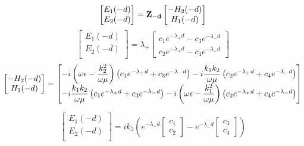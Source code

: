 \begin{equation}
    \begin{bmatrix}
        E_1(-d)\\
        E_2(-d)\\
    \end{bmatrix}
    =
    \mathbf{Z_{-d}} 
    \begin{bmatrix}
        -H_2(-d)\\
        H_1(-d)\\
    \end{bmatrix}
\end{equation}
\begin{equation}
    \begin{bmatrix}
        E_1(-d)\\
        E_2(-d)\\
    \end{bmatrix}
    = \lambda_{+}
    \begin{bmatrix}
        c_1 e^{-\lambda_+ d} - c_3 e^{-\lambda_- d} \\
        c_2 e^{-\lambda_+ d} - c_4 e^{-\lambda_- d}
    \end{bmatrix}
\end{equation}
\begin{equation}
    \begin{bmatrix}
        -H_2(-d)\\
        H_1(-d)\\
    \end{bmatrix}
    =
    \begin{bmatrix}
        -i\left(\omega\epsilon-\dfrac{k_2^2}{\omega\mu}\right)\left(c_1 e^{-\lambda_+ d} + c_3 e^{-\lambda_- d}\right) - i\dfrac{k_1k_2}{\omega\mu}\left(c_2e^{-\lambda_+ d} + c_4e^{-\lambda_- d}\right)\\
        -i\dfrac{k_1k_2}{\omega\mu}\left(c_1 e^{-\lambda_+ d} + c_3 e^{-\lambda_- d} \right) - i\left(\omega\epsilon-\dfrac{k_1^2}{\omega\mu}\right)\left(c_2e^{-\lambda_+ d} + c_4e^{-\lambda_- d}\right)\\
    \end{bmatrix}
\end{equation}

\begin{equation}
    \begin{bmatrix}
        E_1(-d)\\
        E_2(-d)\\
    \end{bmatrix}
    = ik_3\left( e^{-\lambda_+ d}
    \begin{bmatrix}
        c_1\\
        c_2
    \end{bmatrix}
    - e^{-\lambda_- d}
    \begin{bmatrix}
        c_3 \\
        c_4 
    \end{bmatrix}
    \right)
\end{equation}

